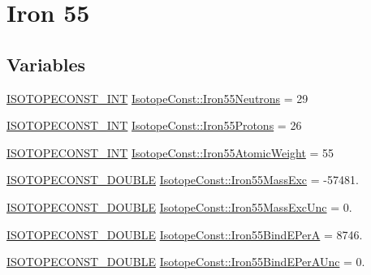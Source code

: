 \hypertarget{group___isotope_const-_iron-_fe55}{}\section{Iron 55}
\label{group___isotope_const-_iron-_fe55}
\subsection*{Variables}
\begin{DoxyCompactItemize}
\item 
\mbox{\hyperlink{group___isotope_const-_macros_ga5f18360b3e99483a35c32d789e62621c}{I\+S\+O\+T\+O\+P\+E\+C\+O\+N\+S\+T\+\_\+\+I\+NT}} \mbox{\hyperlink{group___isotope_const-_iron-_fe55_ga62a767f644de98a33d107ed0ce39e652}{Isotope\+Const\+::\+Iron55\+Neutrons}} = 29
\item 
\mbox{\hyperlink{group___isotope_const-_macros_ga5f18360b3e99483a35c32d789e62621c}{I\+S\+O\+T\+O\+P\+E\+C\+O\+N\+S\+T\+\_\+\+I\+NT}} \mbox{\hyperlink{group___isotope_const-_iron-_fe55_ga2fe668658de40c86fcdc80fc2ec553cd}{Isotope\+Const\+::\+Iron55\+Protons}} = 26
\item 
\mbox{\hyperlink{group___isotope_const-_macros_ga5f18360b3e99483a35c32d789e62621c}{I\+S\+O\+T\+O\+P\+E\+C\+O\+N\+S\+T\+\_\+\+I\+NT}} \mbox{\hyperlink{group___isotope_const-_iron-_fe55_gae6e503e1d5295d051d14f4dc397ce38b}{Isotope\+Const\+::\+Iron55\+Atomic\+Weight}} = 55
\item 
\mbox{\hyperlink{group___isotope_const-_macros_ga8f45a7272ce02c0b4c65c44636ed719a}{I\+S\+O\+T\+O\+P\+E\+C\+O\+N\+S\+T\+\_\+\+D\+O\+U\+B\+LE}} \mbox{\hyperlink{group___isotope_const-_iron-_fe55_ga75e19089b1242b1e871633c2a2563720}{Isotope\+Const\+::\+Iron55\+Mass\+Exc}} = -\/57481.
\item 
\mbox{\hyperlink{group___isotope_const-_macros_ga8f45a7272ce02c0b4c65c44636ed719a}{I\+S\+O\+T\+O\+P\+E\+C\+O\+N\+S\+T\+\_\+\+D\+O\+U\+B\+LE}} \mbox{\hyperlink{group___isotope_const-_iron-_fe55_gaefb5be30fa4d617468512472652f021e}{Isotope\+Const\+::\+Iron55\+Mass\+Exc\+Unc}} = 0.
\item 
\mbox{\hyperlink{group___isotope_const-_macros_ga8f45a7272ce02c0b4c65c44636ed719a}{I\+S\+O\+T\+O\+P\+E\+C\+O\+N\+S\+T\+\_\+\+D\+O\+U\+B\+LE}} \mbox{\hyperlink{group___isotope_const-_iron-_fe55_gab6e50ea6fa7d5036a9868c455a72a368}{Isotope\+Const\+::\+Iron55\+Bind\+E\+PerA}} = 8746.
\item 
\mbox{\hyperlink{group___isotope_const-_macros_ga8f45a7272ce02c0b4c65c44636ed719a}{I\+S\+O\+T\+O\+P\+E\+C\+O\+N\+S\+T\+\_\+\+D\+O\+U\+B\+LE}} \mbox{\hyperlink{group___isotope_const-_iron-_fe55_ga3517723a56fa0364feadba015201b5ec}{Isotope\+Const\+::\+Iron55\+Bind\+E\+Per\+A\+Unc}} = 0.

\end{DoxyCompactItemize}
